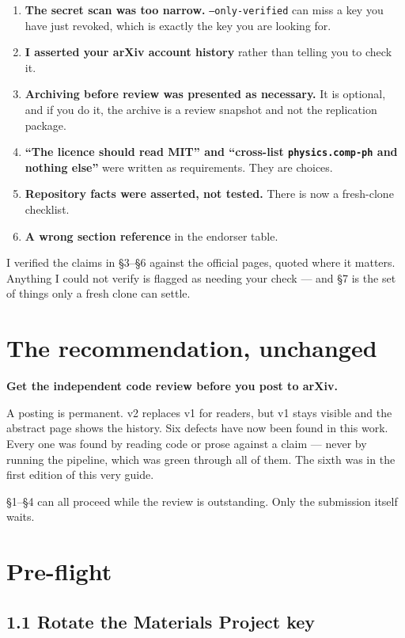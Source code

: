 \documentclass[11pt]{article}
\begin{document}
\begin{enumerate}[nosep]
\item \textbf{The secret scan was too narrow.} \texttt{--only-verified} can miss a key you
      have just revoked, which is exactly the key you are looking for.
\item \textbf{I asserted your arXiv account history} rather than telling you to check it.
\item \textbf{Archiving before review was presented as necessary.} It is optional, and if
      you do it, the archive is a review snapshot and not the replication package.
\item \textbf{``The licence should read MIT'' and ``cross-list \texttt{physics.comp-ph} and
      nothing else''} were written as requirements. They are choices.
\item \textbf{Repository facts were asserted, not tested.} There is now a fresh-clone
      checklist.
\item \textbf{A wrong section reference} in the endorser table.
\end{enumerate}

I verified the claims in \S3--\S6 against the official pages, quoted where it matters.
Anything I could not verify is flagged as needing your check --- and \S7 is the set of
things only a fresh clone can settle.

\section*{The recommendation, unchanged}

\textbf{Get the independent code review before you post to arXiv.}

A posting is permanent. v2 replaces v1 for readers, but v1 stays visible and the abstract
page shows the history. Six defects have now been found in this work. Every one was found by
reading code or prose against a claim --- never by running the pipeline, which was green
through all of them. The sixth was in the first edition of this very guide.

\S1--\S4 can all proceed while the review is outstanding. Only the submission itself waits.

\section{Pre-flight}

\subsection*{1.1 Rotate the Materials Project key}
\end{document}

